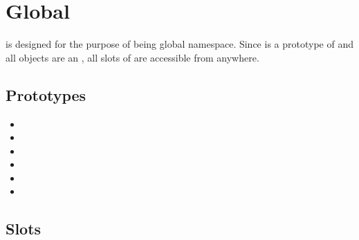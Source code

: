 \section{Global}

 is designed for the purpose of being global
namespace. Since  is a prototype of  and all
objects are an , all slots of  are accessible from
anywhere.

\subsection{Prototypes}
\begin{itemize}
\item {}
\item {}
\item {}
\item {}
\item {}
\item {}
\end{itemize}

\subsection{Slots}

